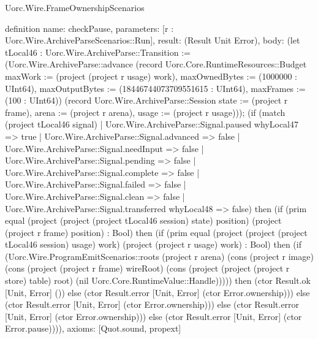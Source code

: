 \begin{lexlean}{Uorc.Wire.FrameOwnershipScenarios}
\begin{semanticmodule}
definition{
  name: checkPause,
  parameters: [r : Uorc.Wire.ArchiveParseScenarios::Run],
  result: (Result Unit Error),
  body: (let tLocal46 : Uorc.Wire.ArchiveParse::Transition := (Uorc.Wire.ArchiveParse::advance (record Uorc.Core.RuntimeResources::Budget {maxWork := (project (project r usage) work), maxOwnedBytes := (1000000 : UInt64), maxOutputBytes := (18446744073709551615 : UInt64), maxFrames := (100 : UInt64)}) (record Uorc.Wire.ArchiveParse::Session {state := (project r frame), arena := (project r arena), usage := (project r usage)})); (if (match (project tLocal46 signal)
    | Uorc.Wire.ArchiveParse::Signal.paused whyLocal47 => true
    | Uorc.Wire.ArchiveParse::Signal.advanced => false
    | Uorc.Wire.ArchiveParse::Signal.needInput => false
    | Uorc.Wire.ArchiveParse::Signal.pending => false
    | Uorc.Wire.ArchiveParse::Signal.complete => false
    | Uorc.Wire.ArchiveParse::Signal.failed => false
    | Uorc.Wire.ArchiveParse::Signal.clean => false
    | Uorc.Wire.ArchiveParse::Signal.transferred whyLocal48 => false) then (if (prim equal (project (project (project tLocal46 session) state) position) (project (project r frame) position) : Bool) then (if (prim equal (project (project (project tLocal46 session) usage) work) (project (project r usage) work) : Bool) then (if (Uorc.Wire.ProgramEmitScenarios::roots (project r arena) (cons (project r image) (cons (project (project r frame) wireRoot) (cons (project (project (project r store) table) root) (nil Uorc.Core.RuntimeValue::Handle))))) then (ctor Result.ok [Unit, Error] ()) else (ctor Result.error [Unit, Error] (ctor Error.ownership))) else (ctor Result.error [Unit, Error] (ctor Error.ownership))) else (ctor Result.error [Unit, Error] (ctor Error.ownership))) else (ctor Result.error [Unit, Error] (ctor Error.pause)))),
  axioms: [Quot.sound, propext]
}


\end{semanticmodule}
\end{lexlean}
